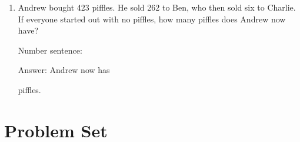 \documentclass{tufte-book}
\begin{document}
\begin{enumerate}
  \item Andrew bought 423 piffles. He sold 262 to Ben, who then sold six to Charlie.
  If everyone started out with no piffles, 
  how many piffles does Andrew now have?\bigskip\par
  Number sentence: \dotfill\bigskip\par
  Answer: Andrew now has \dotfill\bigskip\par\dotfill\bigskip\par\dotfill\bigskip piffles.
  
\end{enumerate}

\clearpage\section{Problem Set }
\end{document}
